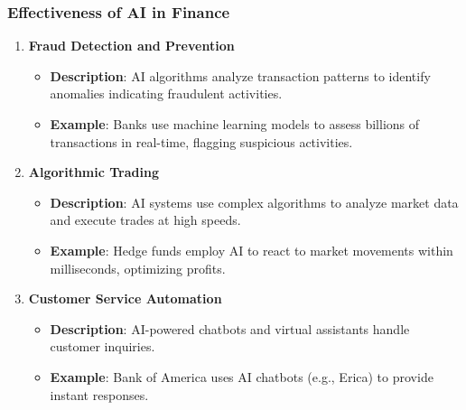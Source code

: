 \documentclass{beamer}
\begin{document}
\begin{frame}[fragile]
    \frametitle{Effectiveness of AI in Finance}
    \begin{enumerate}
        \item \textbf{Fraud Detection and Prevention}
            \begin{itemize}
                \item \textbf{Description}: AI algorithms analyze transaction patterns to identify anomalies indicating fraudulent activities.
                \item \textbf{Example}: Banks use machine learning models to assess billions of transactions in real-time, flagging suspicious activities.
            \end{itemize}
        
        \item \textbf{Algorithmic Trading}
            \begin{itemize}
                \item \textbf{Description}: AI systems use complex algorithms to analyze market data and execute trades at high speeds.
                \item \textbf{Example}: Hedge funds employ AI to react to market movements within milliseconds, optimizing profits.
            \end{itemize}
        
        \item \textbf{Customer Service Automation}
            \begin{itemize}
                \item \textbf{Description}: AI-powered chatbots and virtual assistants handle customer inquiries.
                \item \textbf{Example}: Bank of America uses AI chatbots (e.g., Erica) to provide instant responses.
            \end{itemize}
    \end{enumerate}
\end{frame}
\end{document}
